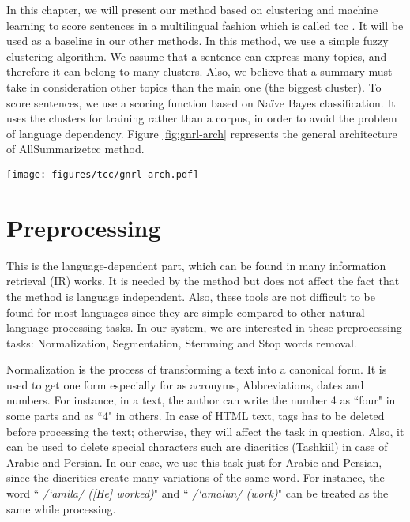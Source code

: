 In this chapter, we will present our method based on clustering and machine learning to score sentences in a multilingual fashion which is called \acf{tcc} \citep{13-aries-al,15-aries-al}. 
It will be used as a baseline in our other methods. 
%
In this method, we use a simple fuzzy clustering algorithm.
We assume that a sentence can express many topics, and therefore it can belong to many clusters.
Also, we believe that a summary must take in consideration other topics than the main one (the biggest cluster).
To score sentences, we use a scoring function based on Na\"ive Bayes classification. 
It uses the clusters for training rather than a corpus, in order to avoid the problem of language dependency.
Figure \ref{fig:gnrl-arch} represents the general architecture of AllSummarize\ac{tcc} method.

\begin{figure*}
	\begin{center}
		\texttt{[image: figures/tcc/gnrl-arch.pdf]}
	\end{center}
	\caption{\label{fig:gnrl-arch} General architecture of AllSummarizer (TCC method).}
\end{figure*}


\section{Preprocessing}

This is the language-dependent part, which can be found in many information retrieval (IR) works. 
It is needed by the method but does not affect the fact that the method is language independent. 
Also, these tools are not difficult to be found for most languages since they are simple compared to other natural language processing tasks.
In our system, we are interested in these preprocessing tasks: Normalization, Segmentation, Stemming and Stop words removal.


Normalization is the process of transforming a text into a canonical form. 
It is used to get one form especially for as acronyms, Abbreviations, dates and numbers. 
For instance, in a text, the author can write the number 4 as ``four" in some parts and as ``4" in others. 
In case of HTML text, tags has to be deleted before processing the text; otherwise, they will affect the task in question. 
Also, it can be used to delete special characters such  are diacritics (Tashkiil) in case of Arabic and  Persian. 
In our case, we use this task just for Arabic and Persian, since the diacritics create many variations of the same word. 
For instance, the word `` \textit{/‘amila/ ([He] worked)}" and `` \textit{/‘amalun/ (work)}" can be treated as the same while processing.

